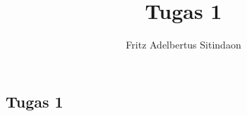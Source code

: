 \documentclass{article}
\title{Tugas 1}
\author{Fritz Adelbertus Sitindaon}
\date{}
\begin{document}
\begin{flushright}
    \section*{Tugas 1}
\end{flushright}
\end{document}

